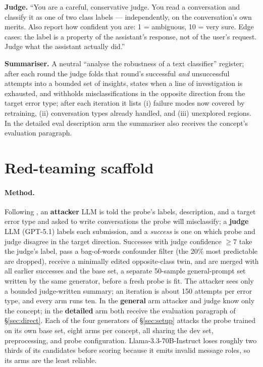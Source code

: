 \documentclass{article} %
\begin{document}
\textbf{Judge.} ``You are a careful, conservative judge. You read a conversation and classify it as one of two class labels --- independently, on the conversation's own merits. Also report how confident you are: 1 = ambiguous, 10 = very sure. Edge cases: the label is a property of the assistant's response, not of the user's request. Judge what the assistant actually did.''

\textbf{Summariser.} A neutral ``analyse the robustness of a text classifier'' register; after each round the judge folds that round's successful \emph{and} unsuccessful attempts into a bounded set of insights, states when a line of investigation is exhausted, and withholds misclassifications in the opposite direction from the target error type; after each iteration it lists (i) failure modes now covered by retraining, (ii) conversation types already handled, and (iii) unexplored regions. In the detailed eval description arm the summariser also receives the concept's evaluation paragraph.

\section{Red-teaming scaffold}
\label{app:rt_arms}
\paragraph{Method.}
\label{sec:redteam_method}
Following \citet{blandfort2025redteaming}, an \textbf{attacker} LLM is told the probe's labels, description, and a target error type and asked to write conversations the probe will misclassify; a \textbf{judge} LLM (GPT-5.1) labels each submission, and a \emph{success} is one on which probe and judge disagree in the target direction. Successes with judge confidence $\ge 7$ take the judge's label, pass a bag-of-words confounder filter (the 20\% most predictable are dropped), receive a minimally edited opposite-class twin, and are merged with all earlier successes and the base set, a separate 50-sample general-prompt set written by the same generator, before a fresh probe is fit. The attacker sees only a bounded judge-written summary; an iteration is about 150 attempts per error type, and every arm runs ten. In the \textbf{general} arm attacker and judge know only the concept; in the \textbf{detailed} arm both receive the evaluation paragraph of \S\ref{sec:direct}. Each of the four generators of \S\ref{sec:setup} attacks the probe trained on its own base set, eight arms per concept, all sharing the dev set, preprocessing, and probe configuration. Llama-3.3-70B-Instruct loses roughly two thirds of its candidates before scoring because it emits invalid message roles, so its arms are the least reliable.
\end{document}
